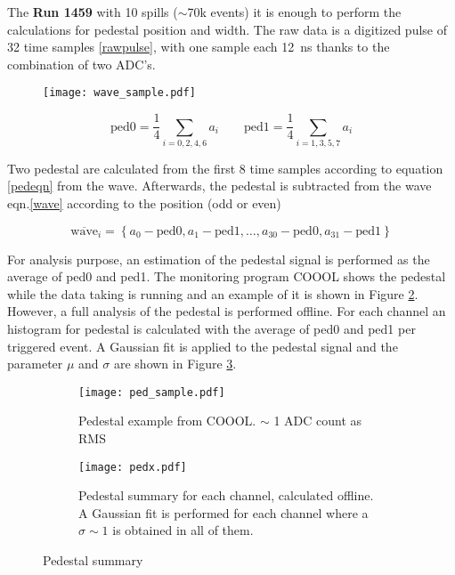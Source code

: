 The {\bf Run 1459} with 10 spills ($\sim$70k events) it is enough to perform the calculations for pedestal position and
width. The raw data is a digitized pulse of 32 time samples \ref{rawpulse}, with one sample each \SI{12}{ns} thanks to the
combination of two ADC's.

\begin{figure}[ht]
	\hspace*{\fill}
	\centering
	\texttt{[image: wave\_sample.pdf]}
	\hspace*{\fill}
	\caption{}\label{}
\end{figure}

\begin{equation}\label{pedeqn}
\mathrm{ped}0=\frac{1}{4}\sum_{i=0,2,4,6}a_i \qquad \mathrm{ped}1=\frac{1}{4}\sum_{i=1,3,5,7}a_i
\end{equation}

Two pedestal are calculated from the first 8 time samples according to equation \ref{pedeqn} from the wave.
Afterwards, the pedestal is subtracted from the wave eqn.\ref{wave} according to the position (odd or even)

\begin{equation}\label{waveped}
\overline{\mathrm{wave}}_{i}=\left\{a_0-\mathrm{ped}0,a_1-\mathrm{ped}1,\dotsc,a_{30}-\mathrm{ped}0,a_{31}-\mathrm{ped}1\right\}
\end{equation}

For analysis purpose, an estimation of the pedestal signal is performed as the average of ped0 and ped1. The monitoring
program COOOL shows the pedestal while the data taking is running and an example of it is shown in Figure
\ref{pedestal}. However, a full analysis of the pedestal is performed offline. For each channel an histogram for pedestal
is calculated with the average of ped0 and ped1 per triggered event. A Gaussian fit is applied to the pedestal signal
and the parameter $\mu$ and $\sigma$ are shown in Figure \ref{pedsum}.

\begin{figure}[ht]
	\hspace*{\fill}
	\begin{subfigure}[b]{0.4\textwidth}
	\centering
	\texttt{[image: ped\_sample.pdf]}
	\caption{Pedestal example from COOOL. $\sim$ 1 ADC count as RMS}\label{pedestal}
	\end{subfigure}
	\begin{subfigure}[b]{0.4\textwidth}
	\centering
	\texttt{[image: pedx.pdf]}
	\caption{Pedestal summary for each channel, calculated offline. A Gaussian fit is performed for each channel where a
	$\sigma\sim 1$ is obtained in all of them.}\label{pedsum}
	\end{subfigure}
	\hspace*{\fill}
	\caption{Pedestal summary}\label{}
\end{figure}

